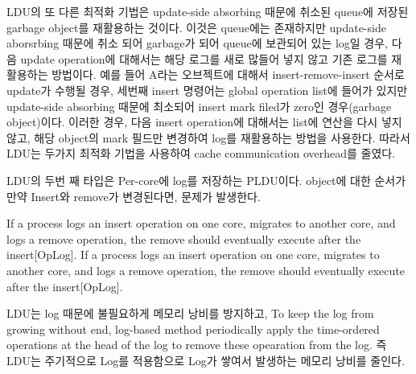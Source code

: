 \else
\fi



\ifkor
LDU의 또 다른 최적화 기법은 update-side absorbing 때문에 취소된 queue에 저장된 garbage object를 재활용하는
것이다.
이것은 queue에는 존재하지만 update-side aborsrbing 때문에 취소 되어 garbage가 되어 queue에 보관되어 있는
log일 경우, 다음 update operation에 대해서는 해당 로그를 새로 많들어 넣지 않고 기존 로그를 재활용하는 방법이다. 
예를 들어 A라는 오브젝트에 대해서 insert-remove-insert 순서로 update가 수행될 경우, 세번째 insert 명령어는
global operation list에 들어가 있지만 update-side absorbing 때문에 최소되어  insert mark
filed가 zero인 경우(garbage object)이다. 
이러한 경우, 다음 insert operation에 대해서는 list에 연산을 다시 넣지 않고, 해당 object의 mark 필드만 변경하여
log를 재활용하는 방법을 사용한다. 따라서 LDU는 두가지 최적화 기법을 사용하여 cache communication overhead를
줄였다.
\else
\fi



\ifkor
LDU의 두번 째 타입은 Per-core에 log를 저장하는 PLDU이다.  
object에 대한 순서가 만약 Insert와 remove가 변경된다면, 문제가 발생한다.
    
 
If a process logs an insert operation on one core,
migrates to another core, and logs a remove operation, the remove should
eventually execute after the insert[OpLog].
\else
If a process logs an insert operation on one core,
migrates to another core, and logs a remove operation, the remove should
eventually execute after the insert[OpLog].
\fi







\ifkor
LDU는 log 때문에 불필요하게 메모리 낭비를 방지하고, To keep the log from growing without end,
log-based method periodically apply the time-ordered operations at the head of
the log to remove these opearation from the log.
즉 LDU는 주기적으로 Log를 적용함으로 Log가 쌓여서 발생하는 메모리 낭비를 줄인다.
\else
\fi



